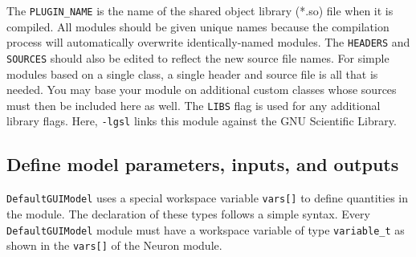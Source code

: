 The \texttt{PLUGIN\_NAME} is the name of the shared object library (*.so) file when it is compiled. All modules should be given unique names because the compilation process will automatically overwrite identically-named modules. The \texttt{HEADERS} and \texttt{SOURCES} should also be edited to reflect the new source file names. For simple modules based on a single class, a single header and source file is all that is needed. You may base your module on additional custom classes whose sources must then be included here as well. The \texttt{LIBS} flag is used for any additional library flags. Here, \texttt{-lgsl} links this module against the GNU Scientific Library.

\subsection{Define model parameters, inputs, and outputs}

\texttt{DefaultGUIModel} uses a special workspace variable \texttt{vars[]} to define quantities in the module. The declaration of these types follows a simple syntax. Every \texttt{DefaultGUIModel} \attention module must have a workspace variable of type \texttt{variable\_t} as shown in the \texttt{vars[]} of the Neuron module. 

